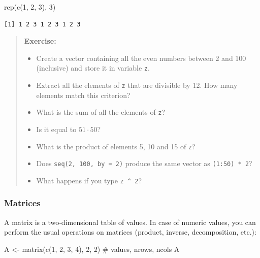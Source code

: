 \documentclass[
  letterpaper,
  DIV=11,
  numbers=noendperiod]{scrreprt}
\newenvironment{Shaded}{\begin{snugshade}}{\end{snugshade}}
\newcommand{\CommentTok}[1]{\textcolor[rgb]{0.37,0.37,0.37}{#1}}
\newcommand{\DecValTok}[1]{\textcolor[rgb]{0.68,0.00,0.00}{#1}}
\newcommand{\FunctionTok}[1]{\textcolor[rgb]{0.28,0.35,0.67}{#1}}
\newcommand{\NormalTok}[1]{\textcolor[rgb]{0.00,0.23,0.31}{#1}}
\newcommand{\OtherTok}[1]{\textcolor[rgb]{0.00,0.23,0.31}{#1}}
\providecommand{\tightlist}{%
  \setlength{\itemsep}{0pt}\setlength{\parskip}{0pt}}\usepackage{longtable,booktabs,array}
\begin{document}
\begin{Shaded}
\begin{Highlighting}[]
\FunctionTok{rep}\NormalTok{(}\FunctionTok{c}\NormalTok{(}\DecValTok{1}\NormalTok{, }\DecValTok{2}\NormalTok{, }\DecValTok{3}\NormalTok{), }\DecValTok{3}\NormalTok{)}
\end{Highlighting}
\end{Shaded}

\begin{verbatim}
[1] 1 2 3 1 2 3 1 2 3
\end{verbatim}

\begin{quote}
\textbf{Exercise:}

\begin{itemize}
\tightlist
\item
  Create a vector containing all the even numbers between 2 and 100
  (inclusive) and store it in variable \texttt{z}.
\item
  Extract all the elements of \texttt{z} that are divisible by 12. How
  many elements match this criterion?
\item
  What is the sum of all the elements of \texttt{z}?
\item
  Is it equal to \(51 \cdot 50\)?
\item
  What is the product of elements 5, 10 and 15 of \texttt{z}?
\item
  Does \texttt{seq(2,\ 100,\ by\ =\ 2)} produce the same vector as
  \texttt{(1:50)\ *\ 2}?
\item
  What happens if you type \texttt{z\ \^{}\ 2}?
\end{itemize}
\end{quote}

\hypertarget{matrices}{%
\subsubsection{Matrices}\label{matrices}}

A matrix is a two-dimensional table of values. In case of numeric
values, you can perform the usual operations on matrices (product,
inverse, decomposition, etc.):

\begin{Shaded}
\begin{Highlighting}[]
\NormalTok{A }\OtherTok{\textless{}{-}} \FunctionTok{matrix}\NormalTok{(}\FunctionTok{c}\NormalTok{(}\DecValTok{1}\NormalTok{, }\DecValTok{2}\NormalTok{, }\DecValTok{3}\NormalTok{, }\DecValTok{4}\NormalTok{), }\DecValTok{2}\NormalTok{, }\DecValTok{2}\NormalTok{) }\CommentTok{\# values, nrows, ncols}
\NormalTok{A }
\end{Highlighting}
\end{Shaded}
\end{document}
